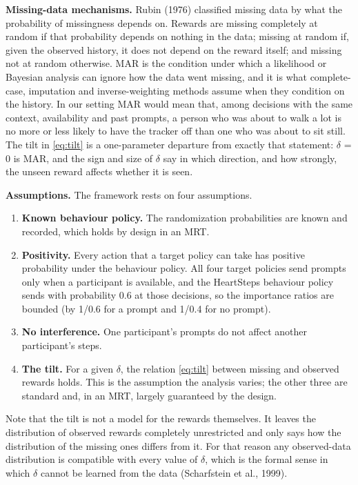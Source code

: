 \documentclass[12pt]{article}
\begin{document}
\textbf{Missing-data mechanisms.} Rubin (1976) classified missing data by what the probability of missingness depends on. Rewards are missing completely at random if that probability depends on nothing in the data; missing at random if, given the observed history, it does not depend on the reward itself; and missing not at random otherwise. MAR is the condition under which a likelihood or Bayesian analysis can ignore how the data went missing, and it is what complete-case, imputation and inverse-weighting methods assume when they condition on the history. In our setting MAR would mean that, among decisions with the same context, availability and past prompts, a person who was about to walk a lot is no more or less likely to have the tracker off than one who was about to sit still. The tilt in \eqref{eq:tilt} is a one-parameter departure from exactly that statement: $\delta$ = 0 is MAR, and the sign and size of $\delta$ say in which direction, and how strongly, the unseen reward affects whether it is seen.

\textbf{Assumptions.} The framework rests on four assumptions.

\begin{enumerate}

\item \textbf{Known behaviour policy.} The randomization probabilities are known and recorded, which holds by design in an MRT.

\item \textbf{Positivity.} Every action that a target policy can take has positive probability under the behaviour policy. All four target policies send prompts only when a participant is available, and the HeartSteps behaviour policy sends with probability 0.6 at those decisions, so the importance ratios are bounded (by 1/0.6 for a prompt and 1/0.4 for no prompt).

\item \textbf{No interference.} One participant's prompts do not affect another participant's steps.

\item \textbf{The tilt.} For a given $\delta$, the relation \eqref{eq:tilt} between missing and observed rewards holds. This is the assumption the analysis varies; the other three are standard and, in an MRT, largely guaranteed by the design.

\end{enumerate}

Note that the tilt is not a model for the rewards themselves. It leaves the distribution of observed rewards completely unrestricted and only says how the distribution of the missing ones differs from it. For that reason any observed-data distribution is compatible with every value of $\delta$, which is the formal sense in which $\delta$ cannot be learned from the data (Scharfstein et al., 1999).
\end{document}
